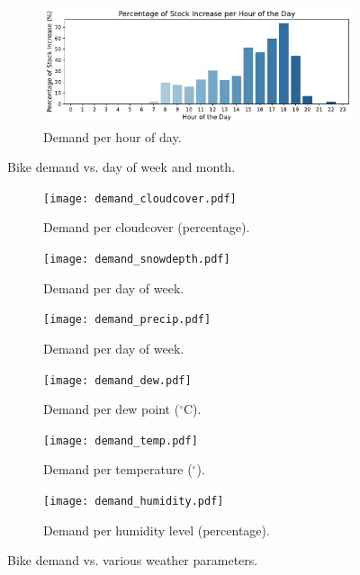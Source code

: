 \begin{figure}[htbp]
\begin{subfigure}{0.45\textwidth}
        \label{fig:demand month}
    \end{subfigure}
    \hfill
    \begin{subfigure}{0.8\textwidth}
        \centering
        \includegraphics[width=\textwidth]{demand_hour.pdf}
        \caption{Demand per hour of day.}
        \label{fig:demand hour}
    \end{subfigure}
    \caption{Bike demand vs. day of week and month.}
    \label{fig:demand day month}
\end{figure}

\begin{figure}[htbp]
    \centering

    \begin{subfigure}{0.30\textwidth}
        \centering
        \texttt{[image: demand\_cloudcover.pdf]}
        \caption{Demand per cloudcover (percentage).}
        \label{fig:demand temp}
    \end{subfigure}
    \hfill
    \begin{subfigure}{0.30\textwidth}
        \centering
        \texttt{[image: demand\_snowdepth.pdf]}
        \caption{Demand per day of week.}
        \label{fig:demand snowdepth}
    \end{subfigure}
    \hfill
    \begin{subfigure}{0.30\textwidth}
        \centering
        \texttt{[image: demand\_precip.pdf]}
        \caption{Demand per day of week.}
        \label{fig:demand precip}
    \end{subfigure}
    \begin{subfigure}{0.30\textwidth}
        \centering
        \texttt{[image: demand\_dew.pdf]}
        \caption{Demand per dew point ($^\circ$C).}
        \label{fig:demand dew}
    \end{subfigure}
    \begin{subfigure}{0.30\textwidth}
        \centering
        \texttt{[image: demand\_temp.pdf]}
        \caption{Demand per temperature ($^\circ$).}
        \label{fig:demand temp}
    \end{subfigure}
    \begin{subfigure}{0.30\textwidth}
        \centering
        \texttt{[image: demand\_humidity.pdf]}
        \caption{Demand per humidity level (percentage).} 
        \label{fig:demand humidity}
    \end{subfigure}
        \caption{Bike demand vs. various weather parameters.}
        \label{fig:demand weather}

\end{figure}


